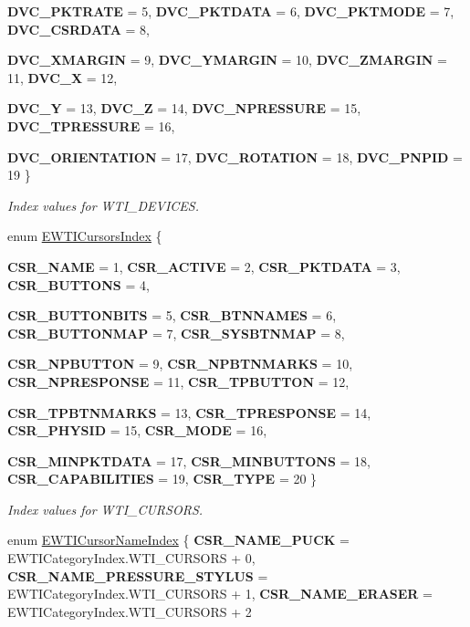 \begin{DoxyCompactItemize}
{\bfseries DVC\_\-PKTRATE} =  5, 
{\bfseries DVC\_\-PKTDATA} =  6, 
{\bfseries DVC\_\-PKTMODE} =  7, 
{\bfseries DVC\_\-CSRDATA} =  8, 
\par
{\bfseries DVC\_\-XMARGIN} =  9, 
{\bfseries DVC\_\-YMARGIN} =  10, 
{\bfseries DVC\_\-ZMARGIN} =  11, 
{\bfseries DVC\_\-X} =  12, 
\par
{\bfseries DVC\_\-Y} =  13, 
{\bfseries DVC\_\-Z} =  14, 
{\bfseries DVC\_\-NPRESSURE} =  15, 
{\bfseries DVC\_\-TPRESSURE} =  16, 
\par
{\bfseries DVC\_\-ORIENTATION} =  17, 
{\bfseries DVC\_\-ROTATION} =  18, 
{\bfseries DVC\_\-PNPID} =  19
 \}
\begin{DoxyCompactList}\small\item\em Index values for WTI\_\-DEVICES. \item\end{DoxyCompactList}\item 
enum \hyperlink{namespace_wintab_d_n_a215ef64798be3e0207e5bbf438659d61}{EWTICursorsIndex} \{ \par
{\bfseries CSR\_\-NAME} =  1, 
{\bfseries CSR\_\-ACTIVE} =  2, 
{\bfseries CSR\_\-PKTDATA} =  3, 
{\bfseries CSR\_\-BUTTONS} =  4, 
\par
{\bfseries CSR\_\-BUTTONBITS} =  5, 
{\bfseries CSR\_\-BTNNAMES} =  6, 
{\bfseries CSR\_\-BUTTONMAP} =  7, 
{\bfseries CSR\_\-SYSBTNMAP} =  8, 
\par
{\bfseries CSR\_\-NPBUTTON} =  9, 
{\bfseries CSR\_\-NPBTNMARKS} =  10, 
{\bfseries CSR\_\-NPRESPONSE} =  11, 
{\bfseries CSR\_\-TPBUTTON} =  12, 
\par
{\bfseries CSR\_\-TPBTNMARKS} =  13, 
{\bfseries CSR\_\-TPRESPONSE} =  14, 
{\bfseries CSR\_\-PHYSID} =  15, 
{\bfseries CSR\_\-MODE} =  16, 
\par
{\bfseries CSR\_\-MINPKTDATA} =  17, 
{\bfseries CSR\_\-MINBUTTONS} =  18, 
{\bfseries CSR\_\-CAPABILITIES} =  19, 
{\bfseries CSR\_\-TYPE} =  20
 \}
\begin{DoxyCompactList}\small\item\em Index values for WTI\_\-CURSORS. \item\end{DoxyCompactList}\item 
enum \hyperlink{namespace_wintab_d_n_a54fdc0e52106effb073b35f8f6b3920a}{EWTICursorNameIndex} \{ {\bfseries CSR\_\-NAME\_\-PUCK} =  EWTICategoryIndex.WTI\_\-CURSORS + 0, 
{\bfseries CSR\_\-NAME\_\-PRESSURE\_\-STYLUS} =  EWTICategoryIndex.WTI\_\-CURSORS + 1, 
{\bfseries CSR\_\-NAME\_\-ERASER} =  EWTICategoryIndex.WTI\_\-CURSORS + 2

\end{DoxyCompactItemize}
